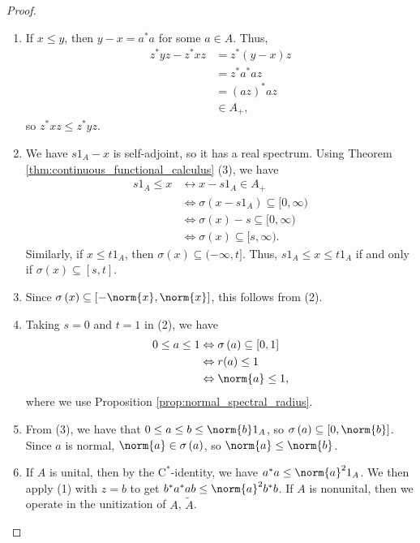 \begin{proof}\hfill
  \begin{enumerate}[(1)]
    \item If $x\leq y$, then $y-x = a^{\ast}a$ for some $a\in A$. Thus,
      \begin{align*}
        z^{\ast}yz - z^{\ast}xz &= z^{\ast}\left( y-x \right)z\\
                                &= z^{\ast}a^{\ast}az\\
                                &= \left( az \right)^{\ast}az\\
                                &\in A_{+},
      \end{align*}
      so $z^{\ast}xz \leq z^{\ast}yz$.
    \item We have $s1_A - x$ is self-adjoint, so it has a real spectrum. Using Theorem \ref{thm:continuous_functional_calculus} (3), we have
      \begin{align*}
        s1_A \leq x &\leftrightarrow x-s1_A \in A_{+}\\
                    &\Leftrightarrow \sigma\left( x-s1_A \right)\subseteq [0,\infty)\\
                    &\Leftrightarrow \sigma\left( x \right)-s \subseteq [0,\infty)\\
                    &\Leftrightarrow \sigma\left( x \right)\subseteq [s,\infty).
      \end{align*}
      Similarly, if $x\leq t1_A$, then $\sigma\left( x \right)\subseteq (-\infty,t]$. Thus, $s1_A \leq x \leq t1_A$ if and only if $\sigma\left( x \right)\subseteq [s,t]$.
    \item Since $\sigma\left( x \right)\subseteq \left[-\norm{x},\norm{x}\right]$, this follows from (2).
    \item Taking $s = 0$ and $t = 1$ in (2), we have
      \begin{align*}
        0\leq a \leq 1 &\Leftrightarrow \sigma\left( a \right)\subseteq [0,1]\\
                       &\Leftrightarrow r(a)\leq 1\\
                       &\Leftrightarrow \norm{a}\leq 1,
      \end{align*}
      where we use Proposition \ref{prop:normal_spectral_radius}.
    \item From (3), we have that $0\leq a \leq b \leq \norm{b}1_A$, so $\sigma\left( a \right)\subseteq [0,\norm{b}]$. Since $a$ is normal, $\norm{a}\in \sigma\left( a \right)$, so $\norm{a}\leq \norm{b}$.
    \item If $A$ is unital, then by the $\mathrm{C}^{\ast}$-identity, we have $a^{\ast}a\leq \norm{a}^21_A$. We then apply (1) with $z = b$ to get $b^{\ast}a^{\ast}ab \leq \norm{a}^2b^{\ast}b$. If $A$ is nonunital, then we operate in the unitization of $A$, $\widetilde{A}$.
  \end{enumerate}
\end{proof}
